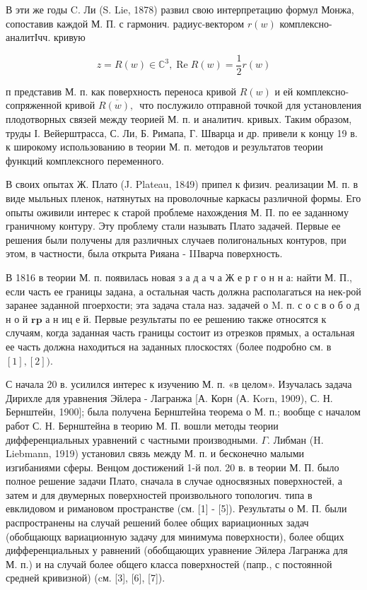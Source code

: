\documentclass[10pt]{article}
\begin{document}
В эти же годы C. Ли (S. Lie, 1878) развил свою интерпретацию формул Монжа, сопоставив каждой М. П. с гармонич. радиус-вектором $r(w)$ комплексно-аналитІчч. кривую



\[

z=R(w) \in \mathbb{C}^{3}, \operatorname{Re} R(w)=\frac{1}{2} r(w)

\]



п представив М. п. как поверхность переноса кривой $R(w)$ и ей комплексно-сопряженной кривой $\overline{R(w) \text {, }}$ что послужило отправной точкой для установления плодотворных связей между теорией М. п. и аналитич. кривых. Таким образом, труды І. Вейерштрасса, С. Ли, Б. Римапа, Г. Шварца и др. привели к концу 19 в. к широкому использованию в теории М. п. методов и результатов теории функций комплексного переменного.



В своих опытах Ж. Плато (J. Plateau, 1849) припел к физич. реализации М. п. в виде мыльных пленок, натянутых на проволочные каркасы различной формы. Его опыты оживили интерес к старой проблеме нахождения М. П. по ее заданному граничному контуру. Эту проблему стали называть Плато задачей. Первые ее решения были получены для различных случаев полигональных контуров, при этом, в частности, была открыта Рияана - IIIварча поверхность.



В 1816 в теории М. п. появилась новая з а д а ч а Ж е р г о н н а: найти М. П., если часть ее границы задана, а остальная часть должна располагаться на нек-рой заранее заданной пгоерхости; эта задача стала наз. задачей о M. п. с о с в о б о д н о й $\boldsymbol{r} \mathbf{p}$ а н иц е й. Первые результаты по ее решению также относятся к случаям, когда заданная часть границы состоит из отрезков прямых, а остальная ее часть должна находиться на заданных плоскостях (более подробно см. в $[1],[2])$.



С начала 20 в. усилился интерес к изучению М. п. «в целом». Изучалась задача Дирихле для уравнения Эйлера - Лагранжа [А. Корн (А. Korn, 1909), С. Н. Бернштейн, 1900]; была получена Бернштейна теорема о М. п.; вообще с началом работ С. Н. Бернштейна в теорию М. П. вошли методы теории дифференциальных уравнений с частными производными. $\Gamma$. Либман (H. Liebmann, 1919) установил связь между М. п. и бесконечно малыми изгибаниями сферы. Венцом достижений 1-й пол. 20 в. в теории М. П. было полное решение задачи Плато, сначала в случае односвязных поверхностей, а затем и для двумерных поверхностей произвольного топологич. типа в евклидовом и римановом пространстве (см. [1] - [5]). Результаты о М. П. были распространены на случай решений более общих вариационных задач (обобщающх вариационную задачу для минимума поверхности), более общих дифференциальных у равнений (обобщающих уравнение Эйлера Лагранжа для М. п.) и на случай более общего класса поверхностей (папр., с постоянной средней кривизной) (cм. [3], [6], [7]).
\end{document}
